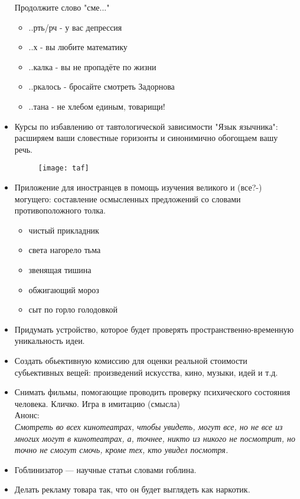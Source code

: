 \begin{itemize}
Продолжите слово "сме..."
\begin{itemize}
    \item[] ..рть/рч - у вас депрессия
    \item[] ..х - вы любите математику
    \item[] ..калка - вы не пропадёте по жизни
    \item[] ..ркалось - бросайте смотреть Задорнова
    \item[] ..тана - не хлебом единым, товарищи!
\end{itemize}
\item Курсы по избавлению от тавтологической зависимости "Язык язычника": расширяем ваши словестные горизонты и синонимично обогощаем вашу речь.
\begin{figure}[ht!]
    \centering
    \texttt{[image: taf]}
\end{figure}
\item Приложение для иностранцев в помощь изучения великого и (все?-) могущего: составление осмысленных предложений со словами противоположного толка.
    \begin{itemize}
        \item чистый прикладник
        \item света нагорело тьма
        \item звенящая тишина
        \item обжигающий мороз
        \item сыт по горло голодовкой
    \end{itemize}
\item Придумать устройство, которое будет проверять пространственно-временную уникальность идеи.
\item Создать обьективную комиссию для оценки реальной стоимости субьективных вещей: произведений искусства, кино, музыки, идей и т.д.
\item Снимать фильмы, помогающие проводить проверку психического состояния человека.
Кличко. Игра в имитацию (смысла) \\
Анонс:\\
\emph{Смотреть во всех кинотеатрах, чтобы увидеть, могут все, но не все из многих могут в кинотеатрах, а, точнее, никто из никого не посмотрит, но точно не смогут смочь, кроме тех, кто увидел посмотря.}
\item Гоблинизатор --- научные статьи словами гоблина.
\item Делать рекламу товара так, что он будет выглядеть как наркотик.


\end{itemize}
